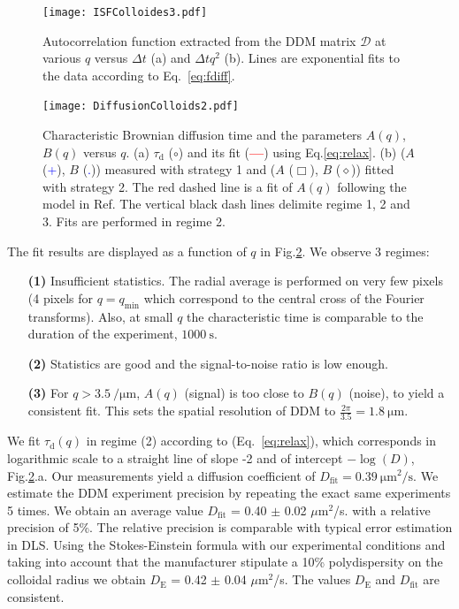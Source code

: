 \documentclass[prb,twocolumn,amsmath,amssymb]{revtex4-1}
\newcommand{\tgn}[1]{{\color{blue}#1}} %
\begin{document}
\begin{figure}
	\texttt{[image: ISFColloides3.pdf]}\\
	\caption{Autocorrelation function extracted from the DDM matrix $\mathcal{D}$ at various $q$ versus $\Delta t$ (a) and $\Delta tq^2$ (b). Lines are exponential fits to the data according to Eq.~\ref{eq:fdiff}.}
	\label{fig:ISF}
\end{figure}

\begin{figure}
	\texttt{[image: DiffusionColloids2.pdf]}\\
	\caption{Characteristic Brownian diffusion time and the parameters $A(q)$, $B(q)$ versus $q$. \tgn{(a) $\tau_\text{d}$ ($\circ$) and its fit (\textcolor{red}{\textbf{---}}) using Eq.\ref{eq:relax}. (b)  ($A$ (\textcolor{blue}{+}), $B$ (\textcolor{blue}{.})) measured with strategy 1  and ($A$ ($\Box$), $B$ ($\diamond$))  fitted with strategy 2. The red dashed line is a fit of $A(q)$ following the model in Ref\citep{3_DDM3D}. The vertical black dash lines delimite regime 1, 2 and 3. Fits are performed in regime 2.} }
	\label{fig:FitDiffColl}
\end{figure}

The fit results are displayed  as a function of $q$ in Fig.\ref{fig:FitDiffColl}. We observe 3 regimes:
\begin{itemize}
\item[\textbf{(1)}] Insufficient statistics. The radial average is performed on very few pixels (4 pixels for $q = q_\text{min}$ which correspond to the central cross of the Fourier transforms).  Also, at small $q$ the characteristic time is comparable to the duration of the experiment, $\SI{1000}{\second}$.
\item[\textbf{(2)}] Statistics are good and the signal-to-noise ratio is low enough.
\item[\textbf{(3)}] For  $q>\SI{3.5}{\per\micro\meter}$, $A(q)$ (signal) is too close to $B(q)$ (noise), to yield a consistent fit. This sets the spatial resolution of DDM to  $\frac{2\pi}{3.5} = \SI{1.8}{\micro\meter}$.
\end{itemize}

We fit $\tau_\text{d}(q)$ in regime (2) according to (Eq.~\ref{eq:relax}), which corresponds in logarithmic scale to a straight line of slope -2 and of intercept $-\log(D)$, Fig.\ref{fig:FitDiffColl}.a. Our measurements yield a diffusion coefficient of $D_\text{fit} = \SI{0.39}{\micro\meter\squared\per\second}$. \tgn{We estimate the DDM experiment precision by repeating the exact same experiments 5 times. We obtain an average value $D_\text{fit}$ = 0.40 $\pm$ 0.02 $\mu$m$^2$/s. with a relative precision of 5\%. The relative precision is comparable with typical error estimation in DLS\cite{Kayori2008}.} \tgn{Using the Stokes-Einstein formula with our experimental conditions and taking into account that the manufacturer stipulate a 10\% polydispersity on the colloidal radius we obtain $D_\text{E}$ = 0.42 $\pm$ 0.04 $\mu$m$^2$/s. The values $D_\text{E}$ and $D_\text{fit}$ are consistent.} 
\end{document}
